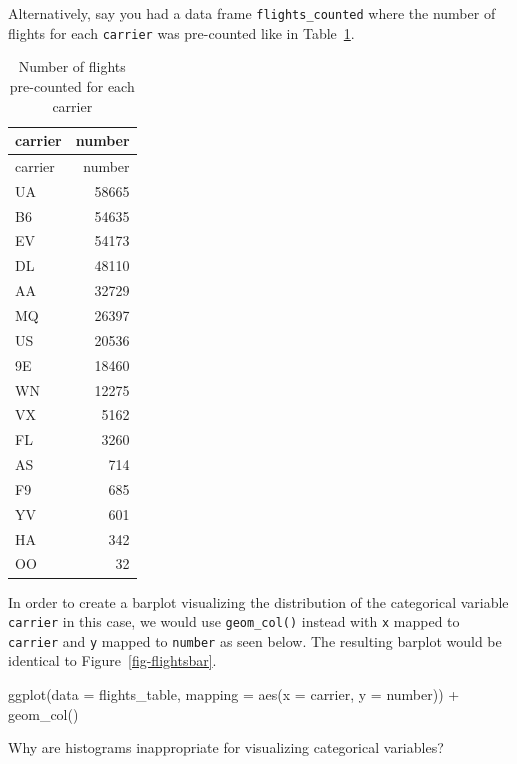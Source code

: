 \documentclass[
  letterpaper,
  DIV=11,
  numbers=noendperiod]{scrreprt}
\newenvironment{Shaded}{\begin{snugshade}}{\end{snugshade}}
\newcommand{\AttributeTok}[1]{\textcolor[rgb]{0.40,0.45,0.13}{#1}}
\newcommand{\FunctionTok}[1]{\textcolor[rgb]{0.28,0.35,0.67}{#1}}
\newcommand{\NormalTok}[1]{\textcolor[rgb]{0.00,0.23,0.31}{#1}}
\newcommand{\SpecialCharTok}[1]{\textcolor[rgb]{0.37,0.37,0.37}{#1}}
\theoremstyle{definition}
\theoremstyle{remark}
\begin{document}
Alternatively, say you had a data frame \texttt{flights\_counted} where
the number of flights for each \texttt{carrier} was pre-counted like in
Table~\ref{tbl-flights-counted}.

\hypertarget{tbl-flights-counted}{}
\begin{longtable}[]{@{}lr@{}}
\caption{\label{tbl-flights-counted}Number of flights pre-counted for
each carrier}\tabularnewline
\toprule\noalign{}
carrier & number \\
\midrule\noalign{}
\endfirsthead
\toprule\noalign{}
carrier & number \\
\midrule\noalign{}
\endhead
\bottomrule\noalign{}
\endlastfoot
UA & 58665 \\
B6 & 54635 \\
EV & 54173 \\
DL & 48110 \\
AA & 32729 \\
MQ & 26397 \\
US & 20536 \\
9E & 18460 \\
WN & 12275 \\
VX & 5162 \\
FL & 3260 \\
AS & 714 \\
F9 & 685 \\
YV & 601 \\
HA & 342 \\
OO & 32 \\
\end{longtable}

In order to create a barplot visualizing the distribution of the
categorical variable \texttt{carrier} in this case, we would use
\texttt{geom\_col()} instead with \texttt{x} mapped to \texttt{carrier}
and \texttt{y} mapped to \texttt{number} as seen below. The resulting
barplot would be identical to Figure~\ref{fig-flightsbar}.

\begin{Shaded}
\begin{Highlighting}[]
\FunctionTok{ggplot}\NormalTok{(}\AttributeTok{data =}\NormalTok{ flights\_table, }\AttributeTok{mapping =} \FunctionTok{aes}\NormalTok{(}\AttributeTok{x =}\NormalTok{ carrier, }\AttributeTok{y =}\NormalTok{ number)) }\SpecialCharTok{+}
  \FunctionTok{geom\_col}\NormalTok{()}
\end{Highlighting}
\end{Shaded}

\begin{tcolorbox}[enhanced jigsaw, colback=white, toprule=.15mm, bottomrule=.15mm, titlerule=0mm, title={{🎯} Learning Check 2.26}, leftrule=.75mm, arc=.35mm, left=2mm, colframe=quarto-callout-tip-color-frame, coltitle=black, opacitybacktitle=0.6, bottomtitle=1mm, colbacktitle=quarto-callout-tip-color!10!white, opacityback=0, toptitle=1mm, rightrule=.15mm, breakable]

Why are histograms inappropriate for visualizing categorical variables?

\end{tcolorbox}
\end{document}

